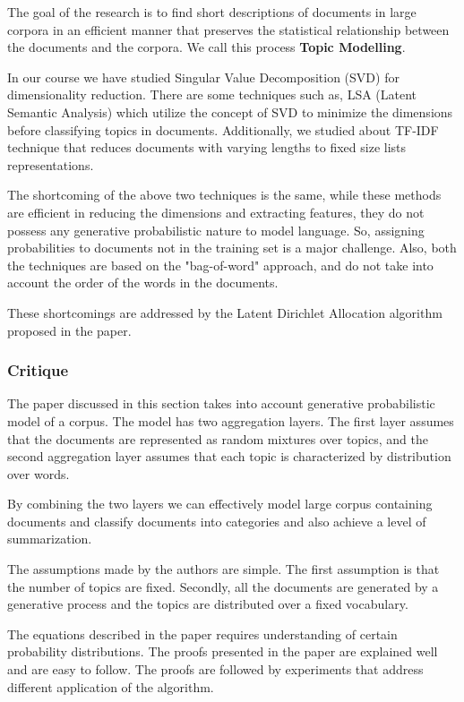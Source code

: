 \documentclass{article}
\begin{document}
The goal of the research is to find short descriptions of documents in large corpora in an efficient manner that preserves the statistical relationship between the documents and the corpora. We call this process \textbf{Topic Modelling}.

In our course we have studied Singular Value Decomposition (SVD) for dimensionality reduction. There are some techniques such as, LSA (Latent Semantic Analysis) which utilize the concept of SVD to minimize the dimensions before classifying topics in documents. Additionally, we studied about TF-IDF technique that reduces documents with varying lengths to fixed size lists representations. 

The shortcoming of the above two techniques is the same, while these methods are efficient in reducing the dimensions and extracting features, they do not possess any generative probabilistic nature to model language. So, assigning probabilities to documents not in the training set is a major challenge. Also, both the techniques are based on the "bag-of-word" approach, and do not take into account the order of the words in the documents. 

These shortcomings are addressed by the Latent Dirichlet Allocation algorithm proposed in the paper. 

\subsubsection{Critique}

The paper discussed in this section takes into account generative probabilistic model of a corpus. The model has two aggregation layers. The first layer assumes that the documents are represented as random mixtures over topics, and the second aggregation layer assumes that each topic is characterized by distribution over words. 

By combining the two layers we can effectively model large corpus containing documents and classify documents into categories and also achieve a level of summarization. 

The assumptions made by the authors are simple. The first assumption is that the number of topics are fixed. Secondly, all the documents are generated by a generative process and the topics are distributed over a fixed vocabulary.

The equations described in the paper requires understanding of certain probability distributions. The proofs presented in the paper are explained well and are easy to follow. The proofs are followed by experiments that address different application of the algorithm. 
\end{document}
